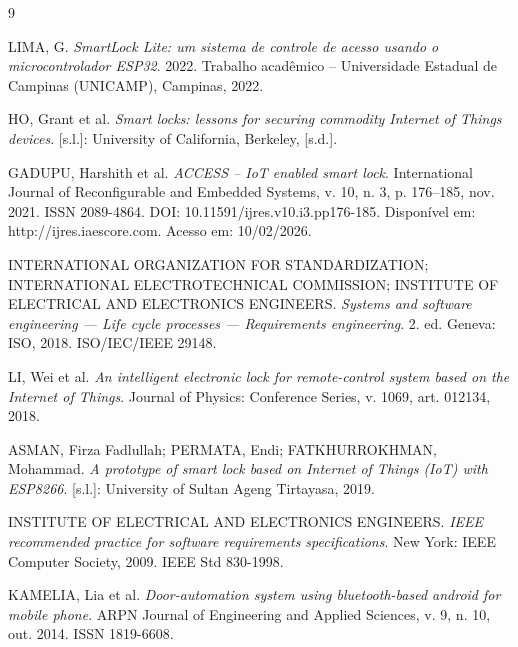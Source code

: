 \begin{thebibliography}{9}

LIMA, G. 
\textit{SmartLock Lite: um sistema de controle de acesso usando o microcontrolador ESP32}. 
2022. Trabalho acadêmico – Universidade Estadual de Campinas (UNICAMP), Campinas, 2022.

HO, Grant et al. 
\textit{Smart locks: lessons for securing commodity Internet of Things devices}. 
[s.l.]: University of California, Berkeley, [s.d.].

GADUPU, Harshith et al. 
\textit{ACCESS – IoT enabled smart lock}. 
International Journal of Reconfigurable and Embedded Systems, v. 10, n. 3, p. 176–185, nov. 2021. 
ISSN 2089-4864. DOI: 10.11591/ijres.v10.i3.pp176-185. 
Disponível em: http://ijres.iaescore.com. Acesso em: 10/02/2026.

INTERNATIONAL ORGANIZATION FOR STANDARDIZATION; 
INTERNATIONAL ELECTROTECHNICAL COMMISSION; 
INSTITUTE OF ELECTRICAL AND ELECTRONICS ENGINEERS. 
\textit{Systems and software engineering — Life cycle processes — Requirements engineering}. 
2. ed. Geneva: ISO, 2018. ISO/IEC/IEEE 29148.

LI, Wei et al. 
\textit{An intelligent electronic lock for remote-control system based on the Internet of Things}. 
Journal of Physics: Conference Series, v. 1069, art. 012134, 2018.

ASMAN, Firza Fadlullah; PERMATA, Endi; FATKHURROKHMAN, Mohammad. 
\textit{A prototype of smart lock based on Internet of Things (IoT) with ESP8266}. 
[s.l.]: University of Sultan Ageng Tirtayasa, 2019.

INSTITUTE OF ELECTRICAL AND ELECTRONICS ENGINEERS. 
\textit{IEEE recommended practice for software requirements specifications}. 
New York: IEEE Computer Society, 2009. IEEE Std 830-1998.

KAMELIA, Lia et al. 
\textit{Door-automation system using bluetooth-based android for mobile phone}. 
ARPN Journal of Engineering and Applied Sciences, v. 9, n. 10, out. 2014. 
ISSN 1819-6608.

\end{thebibliography}